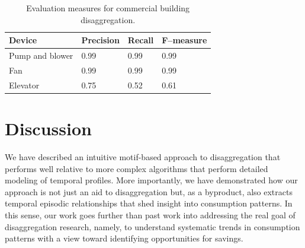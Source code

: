 \begin{table}
 \centering
\caption {Evaluation measures for commercial building disaggregation.} \label{tab_comm}
\begin{tabular} {|l|l|l|l|}
\hline
Device& Precision & Recall &F--measure\\
\hline
Pump and blower & 0.99 & 0.99 & 0.99 \\
Fan  & 0.99 & 0.99 & 0.99 \\
Elevator & 0.75 & 0.52 & 0.61  \\
\hline
\end{tabular}
\end{table}

%
\section{Discussion}
We have described an intuitive motif-based approach to disaggregation that performs
well relative to more complex algorithms that perform detailed modeling of temporal
profiles.
More importantly,
we have demonstrated how our approach is not just an aid to disaggregation
but, as a byproduct, also extracts temporal episodic relationships that shed
insight into consumption patterns. In this sense, our work goes further
than past work into addressing the real goal of disaggregation research,
namely, to understand systematic trends in consumption patterns with a view
toward identifying opportunities for savings.



%
%

